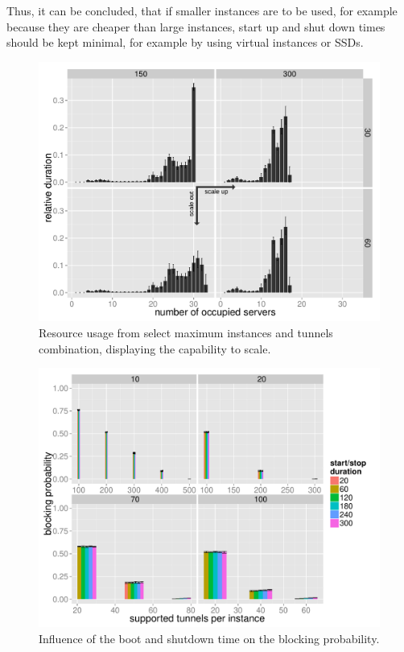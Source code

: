 Thus, it can be concluded, that if smaller instances are to be used, for example because they are cheaper than large instances, start up and shut down times should be kept minimal, for example by using virtual instances or \glspl{SSD}.





\begin{figure}[htb]
  \centering
  \includegraphics[width=1.0\textwidth]{images/resourceusedistribution-detail-barplot-annotated.pdf}
  \caption{Resource usage from select maximum instances and tunnels combination, displaying the capability to scale.}
 \label{c4:fig:res-usage-barplot}
\end{figure}


\begin{figure}[htb]
  \centering
  \includegraphics[width=1.0\textwidth]{images/startstopduration-blockingprobability-barchart.pdf}
  \caption{Influence of the boot and shutdown time on the blocking probability.}
 \label{c4:fig:blockprob-startstop-barchart}
\end{figure}


